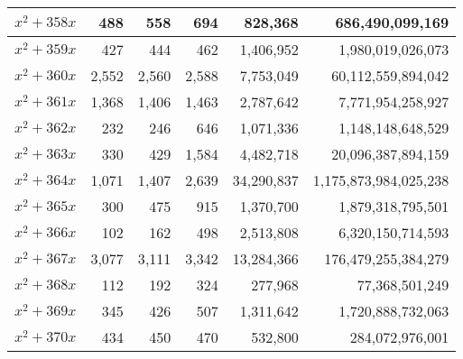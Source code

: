 \documentclass{article}
\begin{document}
\begin{center}
\begin{tabular}{ | c | r | r | r | r | r | }
$x^2 + 358x$ & 488 & 558 & 694 & 828{,}368 & 686{,}490{,}099{,}169 \\ \hline
$x^2 + 359x$ & 427 & 444 & 462 & 1{,}406{,}952 & 1{,}980{,}019{,}026{,}073 \\ \hline
$x^2 + 360x$ & 2{,}552 & 2{,}560 & 2{,}588 & 7{,}753{,}049 & 60{,}112{,}559{,}894{,}042 \\ \hline
$x^2 + 361x$ & 1{,}368 & 1{,}406 & 1{,}463 & 2{,}787{,}642 & 7{,}771{,}954{,}258{,}927 \\ \hline
$x^2 + 362x$ & 232 & 246 & 646 & 1{,}071{,}336 & 1{,}148{,}148{,}648{,}529 \\ \hline
$x^2 + 363x$ & 330 & 429 & 1{,}584 & 4{,}482{,}718 & 20{,}096{,}387{,}894{,}159 \\ \hline
$x^2 + 364x$ & 1{,}071 & 1{,}407 & 2{,}639 & 34{,}290{,}837 & 1{,}175{,}873{,}984{,}025{,}238 \\ \hline
$x^2 + 365x$ & 300 & 475 & 915 & 1{,}370{,}700 & 1{,}879{,}318{,}795{,}501 \\ \hline
$x^2 + 366x$ & 102 & 162 & 498 & 2{,}513{,}808 & 6{,}320{,}150{,}714{,}593 \\ \hline
$x^2 + 367x$ & 3{,}077 & 3{,}111 & 3{,}342 & 13{,}284{,}366 & 176{,}479{,}255{,}384{,}279 \\ \hline
$x^2 + 368x$ & 112 & 192 & 324 & 277{,}968 & 77{,}368{,}501{,}249 \\ \hline
$x^2 + 369x$ & 345 & 426 & 507 & 1{,}311{,}642 & 1{,}720{,}888{,}732{,}063 \\ \hline
$x^2 + 370x$ & 434 & 450 & 470 & 532{,}800 & 284{,}072{,}976{,}001 \\ \hline

\end{tabular}\pagebreak

\begin{tabular}{ | c | r | r | r | r | r | }
\hline


\end{tabular}
\end{center}
\end{document}
